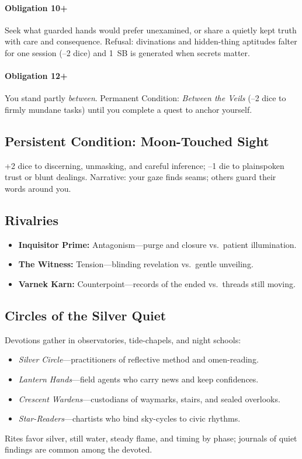 \paragraph{Obligation 10+} Seek what guarded hands would prefer unexamined, or share a quietly kept truth with care and consequence. Refusal: divinations and hidden-thing aptitudes falter for one session (--2 dice) and 1~SB is generated when secrets matter.

\paragraph{Obligation 12+} You stand partly \emph{between}. Permanent Condition: \emph{Between the Veils} (--2 dice to firmly mundane tasks) until you complete a quest to anchor yourself.

\subsection*{Persistent Condition: Moon-Touched Sight}
+2 dice to discerning, unmasking, and careful inference; --1 die to plainspoken trust or blunt dealings. Narrative: your gaze finds seams; others guard their words around you.

\subsection*{Rivalries}
\begin{itemize}
  \item \textbf{Inquisitor Prime:} Antagonism—purge and closure vs.\ patient illumination.
  \item \textbf{The Witness:} Tension—blinding revelation vs.\ gentle unveiling.
  \item \textbf{Varnek Karn:} Counterpoint—records of the ended vs.\ threads still moving.
\end{itemize}

\subsection*{Circles of the Silver Quiet}
Devotions gather in observatories, tide-chapels, and night schools:
\begin{itemize}
  \item \emph{Silver Circle}—practitioners of reflective method and omen-reading.
  \item \emph{Lantern Hands}—field agents who carry news and keep confidences.
  \item \emph{Crescent Wardens}—custodians of waymarks, stairs, and sealed overlooks.
  \item \emph{Star-Readers}—chartists who bind sky-cycles to civic rhythms.
\end{itemize}
Rites favor silver, still water, steady flame, and timing by phase; journals of quiet findings are common among the devoted.

